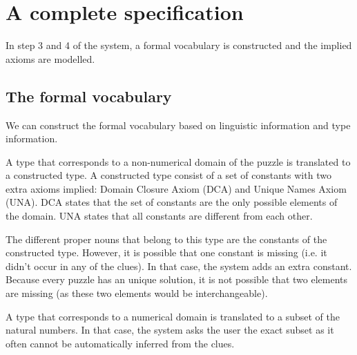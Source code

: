 \section{A complete specification}
In step 3 and 4 of the system, a formal vocabulary is constructed and the implied axioms are modelled.

\subsection{The formal vocabulary}
\label{sec:vocabulary}
We can construct the formal vocabulary based on linguistic information and type information.

A type that corresponds to a non-numerical domain of the puzzle is translated to a constructed type. A constructed type consist of a set of constants with two extra axioms implied: Domain Closure Axiom (DCA) and Unique Names Axiom (UNA). DCA states that the set of constants are the only possible elements of the domain. UNA states that all constants are different from each other.

The different proper nouns that belong to this type are the constants of the constructed type. However, it is possible that one constant is missing (i.e. it didn't occur in any of the clues). In that case, the system adds an extra constant. Because every puzzle has an unique solution, it is not possible that two elements are missing (as these two elements would be interchangeable).

A type that corresponds to a numerical domain is translated to a subset of the natural numbers. In that case, the system asks the user the exact subset as it often cannot be automatically inferred from the clues.




